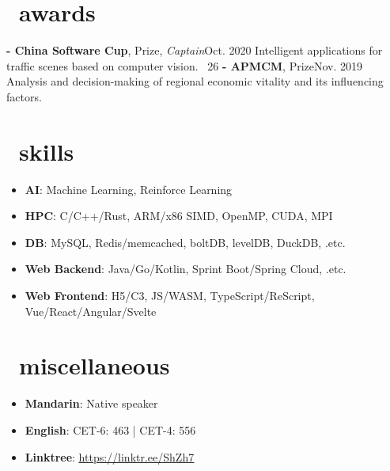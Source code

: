 \documentclass{common}
\begin{document}
\section{\faTrophy\ awards}
\award
    {\textbf{- China Software Cup},  Prize, \textit{Captain}}{Oct. 2020}
    {Intelligent applications for traffic scenes based on computer vision. 
        {\href{https://github.com/Sh-Zh-7/intelligent-transportation-system}{\underline{\faGithub}} \faStarO\ 26}
    }
\award
    {\textbf{- APMCM},  Prize}{Nov. 2019}
    {Analysis and decision-making of regional economic vitality and its influencing factors.}

\section{\faCogs\ skills}
\begin{itemize}[parsep=0.5ex]
    \item \textbf{AI}: Machine Learning, Reinforce Learning
    \item \textbf{HPC}: C/C++/Rust, ARM/x86 SIMD, OpenMP, CUDA, MPI
    \item \textbf{DB}: MySQL, Redis/memcached, boltDB, levelDB, DuckDB, .etc.
    \item \textbf{Web Backend}: Java/Go/Kotlin, Sprint Boot/Spring Cloud, .etc.
    \item \textbf{Web Frontend}: H5/C3, JS/WASM, TypeScript/ReScript, Vue/React/Angular/Svelte
\end{itemize}

\section{\faInfo\ miscellaneous}
\begin{itemize}[parsep=0.5ex]
    \item \textbf{Mandarin}: Native speaker
    \item \textbf{English}: CET-6: 463 | CET-4: 556
    \item \textbf{Linktree}: \href{https://linktr.ee/ShZh7}{\underline{https://linktr.ee/ShZh7}}
\end{itemize}
\end{document}
